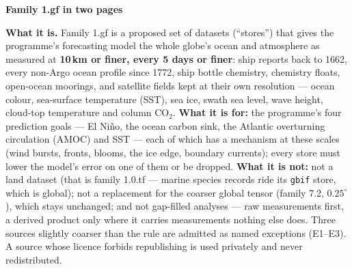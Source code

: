 \documentclass[10pt]{article}
\newcommand{\code}[1]{\texttt{#1}}
\begin{document}
{\LARGE\bfseries Family 1.gf in two pages\par}
\vspace{2pt}{\large the world's ocean and air, measured finer than 10\,km and 5 days\par}
\vspace{2pt}{\small blauewelt/earth --- two-page summary of the design note, 20 September 2026. A glossary of every term follows the two pages.\par}
\vspace{4pt}

\textbf{What it is.} Family 1.gf is a proposed set of datasets (``stores'') that gives the programme's
forecasting model the whole globe's ocean and atmosphere as measured at \textbf{10\,km or finer, every 5 days or
finer}: ship reports back to 1662, every non-Argo ocean profile since 1772, ship bottle chemistry, chemistry floats,
open-ocean moorings, and satellite fields kept at their own resolution --- ocean colour, sea-surface temperature
(SST), sea ice, swath sea level, wave height, cloud-top temperature and column CO$_2$. \textbf{What it is for:} the
programme's four prediction goals --- El Ni\~no, the ocean carbon sink, the Atlantic overturning circulation
(AMOC) and SST --- each of which has a mechanism at these scales (wind bursts, fronts, blooms, the ice edge,
boundary currents); every store must lower the model's error on one of them or be dropped. \textbf{What it is
not:} not a land dataset (that is family 1.0.tf --- marine species records ride its \code{gbif} store, which is global); not a replacement for the coarser global tensor (family 7.2,
$0.25^\circ$), which stays unchanged; and not gap-filled analyses --- raw measurements first, a derived product
only where it carries measurements nothing else does. Three sources slightly coarser than the rule are admitted as
named exceptions (E1--E3). A source whose licence forbids republishing is used privately and never redistributed.
\end{document}
